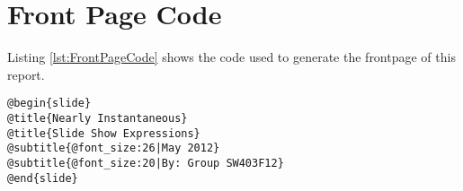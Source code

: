 \section{Front Page Code}
\label{AFrontPageCode}
Listing \ref{lst:FrontPageCode} shows the code used to generate the frontpage of this report.

\begin{lstlisting}[frame=single,caption=NISSE code generating the frontpage, label=lst:FrontPageCode]
@begin{slide}
@title{Nearly Instantaneous}
@title{Slide Show Expressions}
@subtitle{@font_size:26|May 2012}
@subtitle{@font_size:20|By: Group SW403F12}
@end{slide}
\end{lstlisting}